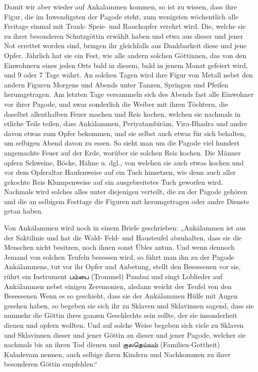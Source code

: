 \documentclass{article}
\newcommand{\TamilText}[1]{\texttamil{#1}}
\newcommand{\tam}[1]{\TamilText{#1}}
\begin{document}
Damit wir aber wieder auf Ankalammen kommen, so ist zu wissen, dass ihre Figur, die im Inwendigsten der Pagode steht, zum wenigsten wöchentlich alle Freitage einmal mit Trank- Speis- und Rauchopfer verehrt wird. Die, welche sie zu ihrer besonderen Schutzgöttin erwählt haben und etwa aus dieser und jener Not errettet worden sind, bringen ihr gleichfalls aus Dankbarkeit diese und jene Opfer. Jährlich hat sie ein Fest, wie alle andern solchen Göttinnen, das von den Einwohnern eines jeden Orts bald in diesem, bald in jenem Monat gefeiert wird, und 9 oder 7 Tage währt. An solchen Tagen wird ihre Figur von Metall nebst den andern Figuren Morgens und Abends unter Tanzen, Springen und Pfeifen herumgetragen. Am letzten Tage versammeln sich des Abends fast alle Einwohner vor ihrer Pagode, und zwar sonderlich die Weiber mit ihren Töchtern, die daselbst allenthalben Feuer machen und Reis kochen, welchen sie nachmals in etliche Teile teilen, dass Ank\={a}lammen, Periyatambir\={a}m, V\={i}ra-Bhadra und andre davon etwas zum Opfer bekommen, und sie selbst auch etwas für sich behalten, um selbigen Abend davon zu essen. So sieht man um die Pagode viel hundert angemachte Feuer auf der Erde, worüber sie solchen Reis kochen. Die Männer opfern Schweine, Böcke, Hähne u. dgl., von welchen sie auch etwas kochen und vor dem Opferaltar Haufenweise auf ein Tuch hinsetzen, wie denn auch aller gekochte Reis Klumpenweise auf ein ausgebreitetes Tuch geworfen wird. Nachmals wird solches alles unter diejenigen verteilt, die zu der Pagode gehören und die an selbigem Festtage die Figuren mit herumgetragen oder andre Dienste getan haben.

Von Ank\={a}lammen wird noch in einem Briefe geschrieben: „Ank\={a}lammen ist aus der Saktilinie und hat die Wald- Feld- und Hausteufel abzuhalten, dass sie die Menschen nicht besitzen, noch ihnen sonst Übles antun. Und wenn dennoch Jemand von solchen Teufeln besessen wird, so führt man ihn zu der Pagode Ank\={a}lammens, tut vor ihr Opfer und Anbetung, stellt den Besessenen vor sie, rührt ein Instrument \tam{பம்பை} (Trommel) Pambai und singt Loblieder auf Ank\={a}lammen nebst einigen Zeremonien, alsdann weicht der Teufel von den Besessenen Wenn es so geschieht, dass sie der Ank\={a}lammen Hülfe mit Augen gesehen haben, so begeben sie sich ihr zu Sklaven und Sklavinnen sagend, dass sie nunmehr die Göttin ihres ganzen Geschlechts sein sollte, der sie insonderheit dienen und opfern wollten. Und auf solche Weise begeben sich viele zu Sklaven und Sklavinnen dieser und jener Göttin an dieser und jener Pagode, welcher sie nachmals bis an ihren Tod dienen und \tam{குலதெய்வம்} (Familien-Gottheit) Kuladevam nennen, auch selbige ihren Kindern und Nachkommen zu ihrer besonderen Göttin empfehlen.“
\end{document}
